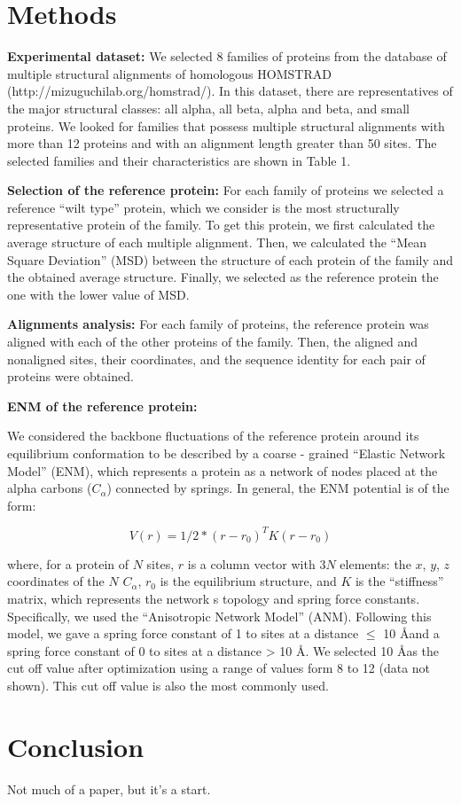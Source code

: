\documentclass{article}
\begin{document}
\section{Methods}

{\bf Experimental dataset:}
We selected 8 families of proteins from the database of multiple structural alignments of homologous HOMSTRAD (http://mizuguchilab.org/homstrad/). In this dataset, there are representatives of the major structural classes: all alpha, all beta, alpha and beta, and small proteins. We looked for families that possess multiple structural alignments with more than 12 proteins and with an alignment length greater than 50 sites. The selected families and their characteristics are shown in Table 1.

{\bf Selection of the reference protein:}
For each family of proteins we selected a reference ``wilt type'' protein, which we consider is the most structurally representative protein of the family. To get this protein, we first calculated the average structure of each multiple alignment. Then, we calculated the ``Mean Square Deviation'' (MSD) between the structure of each protein of the family and the obtained average structure. Finally, we selected as the reference protein the one with the lower value of MSD.

{\bf Alignments analysis:}
For each family of proteins, the reference protein was aligned with each of the other proteins of the family. Then, the aligned and nonaligned sites, their coordinates, and the sequence identity for each pair of proteins were obtained. 

{\bf ENM of the reference protein:} 

We considered the backbone fluctuations of the reference protein around its equilibrium conformation to be described by a coarse - grained ``Elastic Network Model'' (ENM), which represents a protein as a network of nodes placed at the alpha carbons ($C_{\alpha}$) connected by springs. In general, the ENM potential is of the form: 

\begin{equation}
V(r) = 1/2*(r-r_{0})^{T}K(r-r_{0})
\end{equation}

where, for a protein of $N$ sites, $r$ is a column vector with $3N$ elements: the $x$, $y$, $z$ coordinates of the $N$ $C_{\alpha}$, $r_{0}$ is the equilibrium structure, and $K$ is the ``stiffness'' matrix, which represents the network\textsc{} s topology and spring force constants. 
Specifically, we used the ``Anisotropic Network Model'' (ANM). Following this model, we gave a spring force constant of 1 to sites at a distance $\leq$ 10 \AA  and a spring force constant of 0 to sites at a distance > 10 \AA. We selected 10 \AA  as the cut off value after optimization using a range of values form 8 to 12 (data not shown). This cut off value is also the most commonly used. 

\section{Conclusion}
Not much of a paper, but it's a start.
\end{document}
